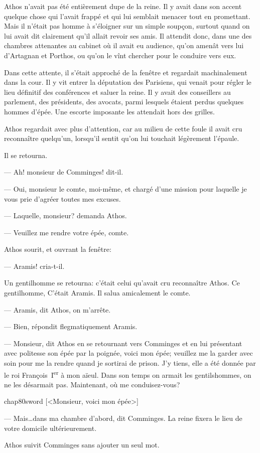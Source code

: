 Athos n'avait pas été entièrement dupe de la reine. Il y avait dans son accent quelque chose qui l'avait frappé et qui lui semblait menacer tout en promettant. Mais il n'était pas homme à s'éloigner sur un simple soupçon, surtout quand on lui avait dit clairement qu'il allait revoir ses amis. Il attendit donc, dans une des chambres attenantes au cabinet où il avait eu audience, qu'on amenât vers lui d'Artagnan et Porthos, ou qu'on le vînt chercher pour le conduire vers eux.

Dans cette attente, il s'était approché de la fenêtre et regardait machinalement dans la cour. Il y vit entrer la députation des Parisiens, qui venait pour régler le lieu définitif des conférences et saluer la reine. Il y avait des conseillers au parlement, des présidents, des avocats, parmi lesquels étaient perdus quelques hommes d'épée. Une escorte imposante les attendait hors des grilles.

Athos regardait avec plus d'attention, car au milieu de cette foule il avait cru reconnaître quelqu'un, lorsqu'il sentit qu'on lui touchait légèrement l'épaule.

Il se retourna.

— Ah! monsieur de Comminges! dit-il.

— Oui, monsieur le comte, moi-même, et chargé d'une mission pour laquelle je vous prie d'agréer toutes mes excuses.

— Laquelle, monsieur? demanda Athos.

— Veuillez me rendre votre épée, comte.

Athos sourit, et ouvrant la fenêtre:

— Aramis! cria-t-il.

Un gentilhomme se retourna: c'était celui qu'avait cru reconnaître Athos. Ce gentilhomme, C'était Aramis. Il salua amicalement le comte.

— Aramis, dit Athos, on m'arrête.

— Bien, répondit flegmatiquement Aramis.

— Monsieur, dit Athos en se retournant vers Comminges et en lui présentant avec politesse son épée par la poignée, voici mon épée; veuillez me la garder avec soin pour me la rendre quand je sortirai de prison. J'y tiens, elle a été donnée par le roi François~I\textsuperscript{er} à mon aïeul. Dans son temps on armait les gentilshommes, on ne les désarmait pas. Maintenant, où me conduisez-vous?

\begin{bwbigpic}
	[\basicscale] 
	{chap80sword}
	[<Monsieur, voici mon épée>]
\end{bwbigpic}

— Mais\dots dans ma chambre d'abord, dit Comminges. La reine fixera le lieu de votre domicile ultérieurement.

Athos suivit Comminges sans ajouter un seul mot.